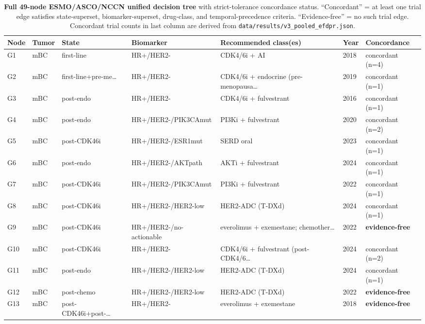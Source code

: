 \begin{table}[H]
\centering
\caption{\textbf{Full 49-node ESMO/ASCO/NCCN unified decision tree} with strict-tolerance concordance status. ``Concordant'' = at least one trial edge satisfies state-superset, biomarker-superset, drug-class, and temporal-precedence criteria. ``Evidence-free'' = no such trial edge. Concordant trial counts in last column are derived from \texttt{data/results/v3\_pooled\_efdpr.json}.}
\label{tab:S3}
\footnotesize
\begin{tabular}{@{}p{}p{}p{}p{}p{}p{}p{}@{}}
\toprule
Node & Tumor & State & Biomarker & Recommended class(es) & Year & Concordance \\
\midrule
G1 & mBC & first-line & HR+/HER2- & CDK4/6i + AI & 2018 & concordant (n=4) \\
G2 & mBC & first-line+pre-me… & HR+/HER2- & CDK4/6i + endocrine (pre-menopausa… & 2019 & concordant (n=1) \\
G3 & mBC & post-endo & HR+/HER2- & CDK4/6i + fulvestrant & 2016 & concordant (n=1) \\
G4 & mBC & post-endo & HR+/HER2-/PIK3CAmut & PI3Ki + fulvestrant & 2020 & concordant (n=2) \\
G5 & mBC & post-CDK46i & HR+/HER2-/ESR1mut & SERD oral & 2023 & concordant (n=1) \\
G6 & mBC & post-endo & HR+/HER2-/AKTpath & AKTi + fulvestrant & 2024 & concordant (n=1) \\
G7 & mBC & post-CDK46i & HR+/HER2-/PIK3CAmut & PI3Ki + fulvestrant & 2022 & concordant (n=1) \\
G8 & mBC & post-CDK46i & HR+/HER2-/HER2-low & HER2-ADC (T-DXd) & 2024 & concordant (n=1) \\
G9 & mBC & post-CDK46i & HR+/HER2-/no-actionable & everolimus + exemestane; chemother… & 2022 & \textbf{evidence-free} \\
G10 & mBC & post-CDK46i & HR+/HER2- & CDK4/6i + fulvestrant (post-CDK4/6… & 2024 & concordant (n=2) \\
G11 & mBC & post-endo & HR+/HER2-/HER2-low & HER2-ADC (T-DXd) & 2024 & concordant (n=1) \\
G12 & mBC & post-chemo & HR+/HER2-/HER2-low & HER2-ADC (T-DXd) & 2022 & \textbf{evidence-free} \\
G13 & mBC & post-CDK46i+post-… & HR+/HER2- & everolimus + exemestane & 2018 & \textbf{evidence-free} \\

\end{tabular}
\end{table}
